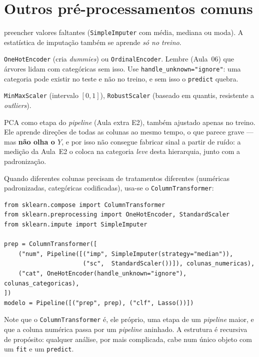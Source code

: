 \documentclass[11pt,a4paper]{article}
\begin{document}
\section{Outros pré-processamentos comuns}
\begin{description}[leftmargin=2.6cm,style=nextline]
  \item[Imputação] preencher valores faltantes (\texttt{SimpleImputer} com média,
        mediana ou moda). A estatística de imputação também se aprende \emph{só no
        treino}.
  \item[Codificação de categóricas] \texttt{OneHotEncoder} (cria \emph{dummies}) ou
        \texttt{OrdinalEncoder}. Lembre (Aula~06) que árvores lidam com categóricas
        sem isso. Use \texttt{handle\_unknown="ignore"}: uma categoria pode existir
        no teste e não no treino, e sem isso o \texttt{predict} quebra.
  \item[Escalas alternativas] \texttt{MinMaxScaler} (intervalo $[0,1]$),
        \texttt{RobustScaler} (baseado em quantis, resistente a \emph{outliers}).
  \item[Redução de dimensão] PCA como etapa do \emph{pipeline} (Aula extra E2),
        também ajustado apenas no treino. Ele aprende direções de todas as colunas
        ao mesmo tempo, o que parece grave --- mas \textbf{não olha o $Y$}, e por
        isso não consegue fabricar sinal a partir de ruído: a medição da Aula~E2 o
        coloca na categoria \emph{leve} desta hierarquia, junto com a padronização.
\end{description}

Quando diferentes colunas precisam de tratamentos diferentes (numéricas
padronizadas, categóricas codificadas), usa-se o \texttt{ColumnTransformer}:
\begin{lstlisting}
from sklearn.compose import ColumnTransformer
from sklearn.preprocessing import OneHotEncoder, StandardScaler
from sklearn.impute import SimpleImputer

prep = ColumnTransformer([
    ("num", Pipeline([("imp", SimpleImputer(strategy="median")),
                      ("sc",  StandardScaler())]), colunas_numericas),
    ("cat", OneHotEncoder(handle_unknown="ignore"), colunas_categoricas),
])
modelo = Pipeline([("prep", prep), ("clf", Lasso())])
\end{lstlisting}
Note que o \texttt{ColumnTransformer} é, ele próprio, uma etapa de um
\emph{pipeline} maior, e que a coluna numérica passa por um \emph{pipeline}
aninhado. A estrutura é recursiva de propósito: qualquer análise, por mais
complicada, cabe num único objeto com um \texttt{fit} e um \texttt{predict}.
\end{document}
